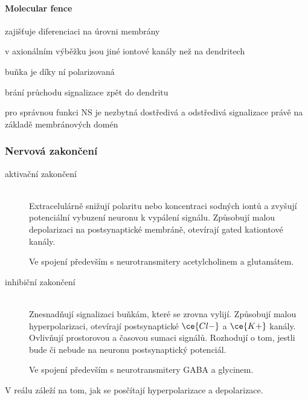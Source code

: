 \documentclass[DIV=8]{scrreprt}
\begin{document}
\paragraph{Molecular fence}
\begin{myItemize}[nosep]
    \item zajišťuje diferenciaci na úrovni membrány
\begin{myItemize}[nosep]
    \item v axionálním výběžku jsou jiné iontové kanály než na dendritech
\end{myItemize}

    \item buňka je díky ní polarizovaná
    \item brání průchodu signalizace zpět do dendritu
    \item pro správnou funkci NS je nezbytná dostředivá a odstředivá signalizace právě na základě membránových domén
\end{myItemize}



\subsubsection{Nervová zakončení} \label{Nervová zakončení}


\begin{description}
\item[aktivační zakončení]\hfill \\
Extracelulárně snižují polaritu nebo koncentraci sodných iontů a zvyšují potenciální vybuzení neuronu k vypálení signálu. Způsobují malou depolarizaci na postsynaptické membráně, otevírají gated kationtové kanály.

Ve spojení především s neurotransmitery acetylcholinem a glutamátem.


\item[inhibiční zakončení]\hfill \\
Znesnadňují signalizaci buňkám, které se zrovna vylijí. Způsobují malou hyperpolarizaci, otevírají postsynaptické \(\ce{Cl-}\) a \(\ce{K+}\) kanály. Ovlivňují prostorovou a časovou sumaci signálů. Rozhodují o tom, jestli bude či nebude na neuronu postsynaptický potenciál.

Ve spojení především s neurotransmitery GABA a glycinem.

\end{description}


V reálu záleží na tom, jak se posčítají hyperpolarizace a depolarizace.
\end{document}
